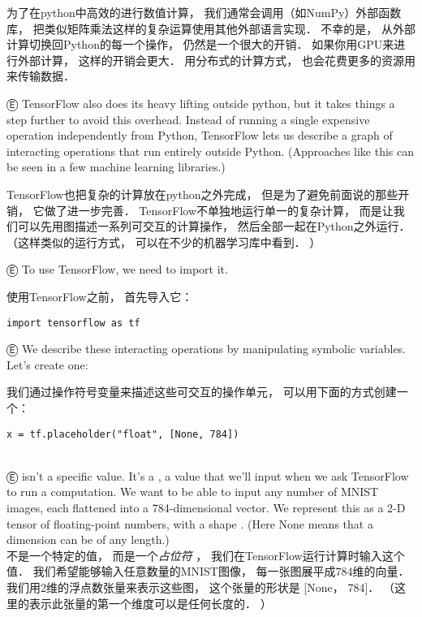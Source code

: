 为了在python中高效的进行数值计算， 我们通常会调用（如NumPy）外部函数库， 把类似矩阵乘法这样的复杂运算使用其他外部语言实现．  不幸的是， 从外部计算切换回Python的每一个操作， 仍然是一个很大的开销．  如果你用GPU来进行外部计算， 这样的开销会更大．  用分布式的计算方式， 也会花费更多的资源用来传输数据．

Ⓔ TensorFlow also does its heavy lifting outside python, but it takes things a step further to avoid this overhead. Instead of running a single expensive operation independently from Python, TensorFlow lets us describe a graph of interacting operations that run entirely outside Python. (Approaches like this can be seen in a few machine learning libraries.)

TensorFlow也把复杂的计算放在python之外完成， 但是为了避免前面说的那些开销， 它做了进一步完善．  TensorFlow不单独地运行单一的复杂计算， 而是让我们可以先用图描述一系列可交互的计算操作， 然后全部一起在Python之外运行．  （这样类似的运行方式， 可以在不少的机器学习库中看到．  ）


Ⓔ To use TensorFlow, we need to import it.

使用TensorFlow之前， 首先导入它：

\begin{lstlisting}
import tensorflow as tf
\end{lstlisting}

Ⓔ We describe these interacting operations by manipulating symbolic variables. Let's create one:

我们通过操作符号变量来描述这些可交互的操作单元， 可以用下面的方式创建一个：

\begin{lstlisting}
x = tf.placeholder("float", [None, 784])
\end{lstlisting}\\
Ⓔ  isn't a specific value. It's a , a value that we'll input when we ask TensorFlow to run a computation. We want to be able to input any number of MNIST images, each flattened into a 784-dimensional vector. We represent this as a 2-D tensor of floating-point numbers, with a shape \li{[None, 784]}. (Here None means that a dimension can be of any length.)\\
 不是一个特定的值， 而是一个{\em 占位符} ， 我们在TensorFlow运行计算时输入这个值．  我们希望能够输入任意数量的MNIST图像， 每一张图展平成784维的向量．  我们用2维的浮点数张量来表示这些图， 这个张量的形状是 [None， 784]．  （这里的表示此张量的第一个维度可以是任何长度的．  ）

